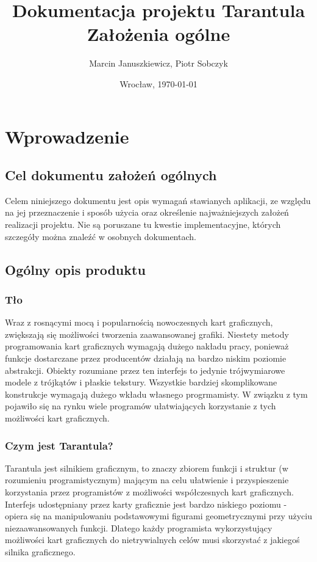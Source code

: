 \documentclass[11pt,leqno]{article}
\title{\LARGE Dokumentacja projektu \textbf{Tarantula}\\
							Założenia ogólne}
\author{Marcin Januszkiewicz, Piotr Sobczyk}
\date{Wrocław, \today}
\begin{document}
\maketitle 
\newpage
\pagestyle{headings}
\tableofcontents

\newpage


\newpage
\section{Wprowadzenie}

\subsection{Cel dokumentu założeń ogólnych}
Celem niniejszego dokumentu jest opis wymagań stawianych aplikacji, ze względu na jej przeznaczenie i 
sposób użycia oraz określenie najważniejszych założeń realizacji projektu. 
Nie są poruszane tu kwestie implementacyjne, których szczegóły można znaleźć w osobnych dokumentach.

\subsection{Ogólny opis produktu}

\subsubsection{Tło}

Wraz z rosnącymi mocą i popularnością nowoczesnych kart graficznych, zwiększają się możliwości tworzenia zaawansowanej grafiki. Niestety metody programowania kart graficznych wymagają dużego nakładu pracy, ponieważ funkcje dostarczane przez producentów działają na bardzo niskim poziomie abstrakcji. Obiekty rozumiane przez ten interfejs to jedynie trójwymiarowe modele z trójkątów i płaskie tekstury. Wszystkie bardziej skomplikowane konstrukcje wymagają dużego wkładu własnego progrmamisty. W związku z tym pojawiło się na rynku wiele programów ułatwiających korzystanie z tych możliwości kart graficznych. 


\subsubsection{Czym jest Tarantula?}
Tarantula jest silnikiem graficznym, to znaczy zbiorem funkcji i struktur (w rozumieniu programistycznym) mającym 
na celu ułatwienie i przyspieszenie korzystania przez programistów z możliwości współczesnych kart graficznych. 
Interfejs udostępniany przez karty graficznie jest bardzo niskiego poziomu - 
opiera się na manipulowaniu podstawowymi figurami geometrycznymi przy użyciu niezaawansowanych funkcji.
Dlatego każdy programista wykorzystujący możliwości kart graficznych do nietrywialnych celów musi skorzystać z jakiegoś silnika graficznego.
\end{document}
